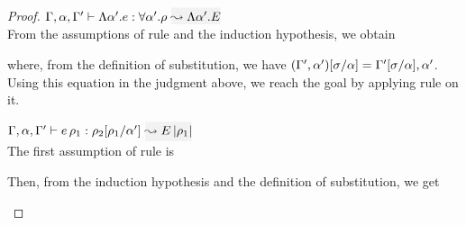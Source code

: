 \begin{proof}
\item[\fbox{\rref{Ty-TAbs}}]\quad$\wte{\tenv,\alpha,\tenv'}{\Abs{\alpha'}{e}}{\tall{\alpha'}{\rulet}}{\Abs{\alpha'}{E}}$\\

From the assumptions of rule  and the induction hypothesis, we obtain
\begin{myequation*}
\wte{\tenv,(\tenv',\alpha')[\suty/\alpha]}{e[\suty/\alpha]}{\rulet}{E\etrans{\suty}/\alpha]}
\end{myequation*}
where, from the definition of substitution, we have
$(\Gamma',\alpha')[\sigma/\alpha] = \Gamma'[\sigma/\alpha],\alpha'$. Using this equation in the judgment above, we reach the goal by applying rule  on it.\\

\item[\fbox{\rref{Ty-TApp}}]\quad
$\wte{\tenv,\alpha,\tenv'}{\mmapp{e}{\rulet_1}}{\rulet_2[\rulet_1/\alpha']}{\mmapp{E}{\etrans{\rulet_1}}}$\\

The first assumption of rule  is
\begin{myequation*}
\end{myequation*}
Then, from the induction hypothesis and the definition of substitution, we get
\begin{myequation*}
\end{myequation*}


\end{proof}
